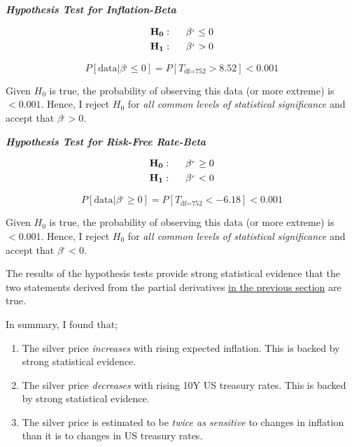 \documentclass[
  12pt,
]{article}
\providecommand{\tightlist}{%
  \setlength{\itemsep}{0pt}\setlength{\parskip}{0pt}}
\begin{document}
\textbf{\emph{Hypothesis Test for Inflation-Beta}}

\begin{align}
\mathbf{H_0}: \hspace{5mm} \beta^{_i} &\leq 0 \notag\\
\mathbf{H_1}: \hspace{5mm} \beta^{_i} &> 0 \notag
\end{align}

\[P[ \textrm{data} | \beta^{_i} \leq 0] = P[T_{\textrm{df=}752} > 8.52] \mathbf{< 0.001}\]

Given \(H_0\) is true, the probability of observing this data (or more
extreme) is \(< 0.001\). Hence, I reject \(H_0\) for \emph{all common
levels of statistical significance} and accept that \(\beta^{_i} > 0\).

\vspace{5 mm}

\textbf{\emph{Hypothesis Test for Risk-Free Rate-Beta}}

\begin{align}
\mathbf{H_0}: \hspace{5mm} \beta^{_r} &\geq 0 \notag\\
\mathbf{H_1}: \hspace{5mm} \beta^{_r} &< 0 \notag
\end{align}

\[P[ \textrm{data} | \beta^{_r} \geq 0] = P[T_{\textrm{df=}752} < -6.18] \mathbf{< 0.001}\]

Given \(H_0\) is true, the probability of observing this data (or more
extreme) is \(< 0.001\). Hence, I reject \(H_0\) for \emph{all common
levels of statistical significance} and accept that \(\beta^{_r} < 0\).

The results of the hypothesis tests provide strong statistical evidence
that the two statements derived from the partial derivatives
\protect\hyperlink{silver-spot-pricing-hypothesis}{in the previous
section} are true.

In summary, I found that;

\begin{enumerate}
\def\labelenumi{\arabic{enumi}.}
\tightlist
\item
  The silver price \emph{increases} with rising expected inflation. This
  is backed by strong statistical evidence.
\item
  The silver price \emph{decreases} with rising 10Y US treasury rates.
  This is backed by strong statistical evidence.
\item
  The silver price is estimated to be \emph{twice as sensitive} to
  changes in inflation than it is to changes in US treasury rates.
\end{enumerate}
\end{document}

